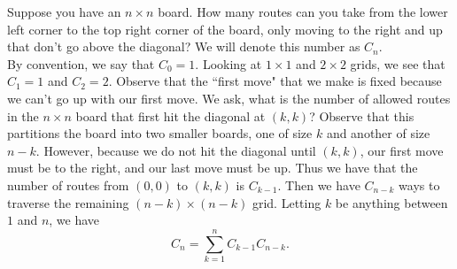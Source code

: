 \documentclass[class=article, crop=false]{standalone}
\begin{document}
  \begin{example}{}
    Suppose you have an $n\times n$ board. How many routes can you take from the lower left corner to the top right corner of the board, only moving to the right and up that don't go above the diagonal? We will denote this number as $C_n$. \\[10pt]
    By convention, we say that $C_0 = 1$. Looking at $1\times 1$ and $2\times 2$ grids, we see that $C_1 = 1$ and $C_2 = 2$. Observe that the ``first move" that we make is fixed because we can't go up with our first move. We ask, what is the number of allowed routes in the $n\times n$ board that first hit the diagonal at $(k, k)$? Observe that this partitions the board into two smaller boards, one of size $k$ and another of size $n-k$. However, because we do not hit the diagonal until $(k,k)$, our first move must be to the right, and our last move must be up. Thus we have that the number of routes from $(0,0)$ to $(k,k)$ is $C_{k-1}$. Then we have $C_{n-k}$ ways to traverse the remaining $(n-k)\times (n-k)$ grid. Letting $k$ be anything between $1$ and $n$, we have
    \[
      C_n = \sum_{k=1}^{n}C_{k-1}C_{n-k}.
    \]
  \end{example}
\end{document}
